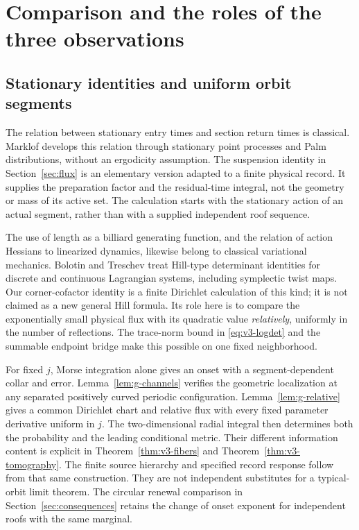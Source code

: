\section{Comparison and the roles of the three observations}
\label{sec:comparison}
\subsection{Stationary identities and uniform orbit segments}
The relation between stationary entry times and section return times is
classical. Marklof \cite{Marklof} develops this relation through stationary
point processes and Palm distributions, without an ergodicity assumption.
The suspension identity in Section~\ref{sec:flux} is an elementary version
adapted to a finite physical record. It supplies the preparation factor
and the residual-time integral, not the geometry or mass of its active set.
The calculation starts with the stationary action of an actual segment,
rather than with a supplied independent roof sequence.

The use of length as a billiard generating function, and the relation of
action Hessians to linearized dynamics, likewise belong to classical
variational mechanics. Bolotin and Treschev \cite{Hill} treat Hill-type
determinant identities for discrete and continuous Lagrangian systems,
including symplectic twist maps. Our corner-cofactor identity is a finite
Dirichlet calculation of this kind; it is not claimed as a new general
Hill formula. Its role here is to compare the exponentially small physical
flux with its quadratic value \emph{relatively}, uniformly in the number
of reflections. The trace-norm bound in \eqref{eq:v3-logdet} and the summable
endpoint bridge make this possible on one fixed neighborhood.

For fixed $j$, Morse integration alone gives an onset with a
segment-dependent collar and error. Lemma~\ref{lem:g-channels}
verifies the geometric localization at any separated positively curved
periodic configuration. Lemma~\ref{lem:g-relative} gives a common
Dirichlet chart and relative flux with every fixed parameter derivative
uniform in $j$. The two-dimensional radial integral then determines
both the probability and the leading conditional metric. Their different
information content is explicit in Theorem~\ref{thm:v3-fibers} and
Theorem~\ref{thm:v3-tomography}. The finite source hierarchy and
specified record response follow from that same construction. They
are not independent substitutes for a typical-orbit limit theorem.
The circular renewal comparison in Section~\ref{sec:consequences}
retains the change of onset exponent for independent roofs with the
same marginal.

